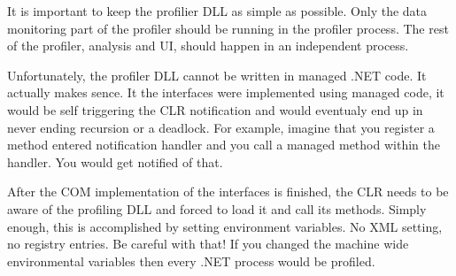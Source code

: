 It is important to keep the profilier DLL as simple as possible. Only the data monitoring part of the profiler should be running in the profiler process. The rest of the profiler, analysis and UI, should happen in an independent process.

Unfortunately, the profiler DLL cannot be written in managed .NET code. It actually makes sence. It the interfaces were implemented using managed code, it would be self triggering the CLR notification and would eventualy end up in never ending recursion or a deadlock. For example, imagine that you register a method entered notification handler and you call a managed method within the handler. You would get notified of that.

After the COM implementation of the interfaces is finished, the CLR needs to be aware of the profiling DLL and forced to load it and call its methods. Simply enough, this is accomplished by setting environment variables. No XML setting, no registry entries. Be careful with that! If you changed the machine wide environmental variables then every .NET process would be profiled. 